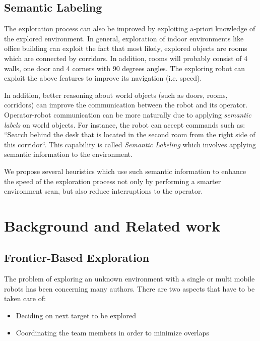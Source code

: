 \documentclass[a4paper,10pt]{article}
\begin{document}




\subsection{Semantic Labeling}
\label{section:SemanticLableing}

The exploration process can also be improved by exploiting a-priori
knowledge of the explored environment. In general, exploration of
indoor environments like office building can exploit the fact that most
likely, explored objects are rooms which are connected by corridors. In
addition, rooms will probably consist of 4 walls, one door and 4 corners
with 90 degrees angles. The exploring robot can exploit the
above features to improve its navigation (i.e. speed).

In addition, better reasoning about world objects (such as doors,
rooms, corridors) can improve the communication between the robot and its
operator. Operator-robot communication can be more naturally due to applying
\emph{semantic labels} on world objects. For instance, the robot can accept
commands such as: ``Search behind the desk that is located in the second room from the right side
of this corridor``. This capability is called \emph{Semantic Labeling} which
involves applying semantic information to the environment.

We propose several heuristics which use such semantic information to enhance
the speed of the exploration process not only by performing a smarter
environment scan, but also reduce interruptions to the operator. 

\section{Background and Related work}
\subsection{Frontier-Based Exploration}

The problem of exploring an unknown environment with a single or multi mobile
robots has been concerning many authors. There are two aspects that have to be
taken care of:
\begin{itemize}
  \item Deciding on next target to be explored
  \item Coordinating the team members in order to minimize overlaps
\end{itemize}
\end{document}
